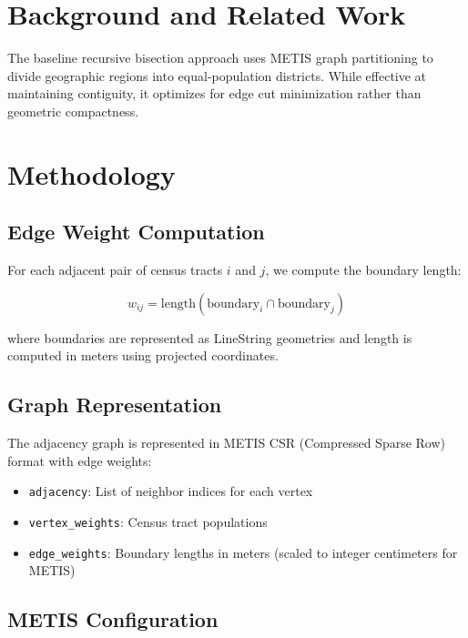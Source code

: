 \documentclass[11pt]{article}
\begin{document}
\section{Background and Related Work}

The baseline recursive bisection approach \cite{TODO} uses METIS graph partitioning to divide geographic regions into equal-population districts. While effective at maintaining contiguity, it optimizes for edge cut minimization rather than geometric compactness.

\section{Methodology}

\subsection{Edge Weight Computation}

For each adjacent pair of census tracts $i$ and $j$, we compute the boundary length:

\begin{equation}
w_{ij} = \text{length}(\text{boundary}_i \cap \text{boundary}_j)
\end{equation}

where boundaries are represented as LineString geometries and length is computed in meters using projected coordinates.

\subsection{Graph Representation}

The adjacency graph is represented in METIS CSR (Compressed Sparse Row) format with edge weights:

\begin{itemize}
\item \texttt{adjacency}: List of neighbor indices for each vertex
\item \texttt{vertex\_weights}: Census tract populations
\item \texttt{edge\_weights}: Boundary lengths in meters (scaled to integer centimeters for METIS)
\end{itemize}

\subsection{METIS Configuration}
\end{document}
